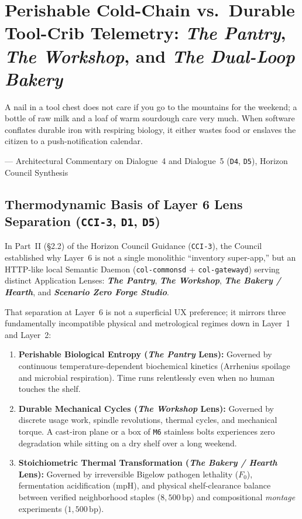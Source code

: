 \chapter{Perishable Cold-Chain vs.\ Durable Tool-Crib Telemetry: \textit{The Pantry}, \textit{The Workshop}, and \textit{The Dual-Loop Bakery}}
\label{ch:pantry-vs-workshop-telemetry}

\epigraph{A nail in a tool chest does not care if you go to the mountains for the weekend; a bottle of raw milk and a loaf of warm sourdough care very much. When software conflates durable iron with respiring biology, it either wastes food or enslaves the citizen to a push-notification calendar.}{--- Architectural Commentary on Dialogue~4 and Dialogue~5 (\texttt{D4}, \texttt{D5}), Horizon Council Synthesis}

\section{Thermodynamic Basis of Layer 6 Lens Separation (\texttt{CCI-3}, \texttt{D1}, \texttt{D5})}
\label{sec:l2-thermodynamic-lens-separation}

In Part~II (\S2.2) of the Horizon Council Guidance (\texttt{CCI-3}), the Council established why Layer~6 is not a single monolithic ``inventory super-app,'' but an HTTP-like local Semantic Daemon (\texttt{col-commonsd} + \texttt{col-gatewayd}) serving distinct Application Lenses: \textbf{\textit{The Pantry}}, \textbf{\textit{The Workshop}}, \textbf{\textit{The Bakery / Hearth}}, and \textbf{\textit{Scenario Zero Forge Studio}}.

That separation at Layer~6 is not a superficial UX preference; it mirrors three fundamentally incompatible physical and metrological regimes down in Layer~1 and Layer~2:
\begin{enumerate}
    \item \textbf{Perishable Biological Entropy (\textit{The Pantry} Lens):} Governed by continuous temperature-dependent biochemical kinetics (Arrhenius spoilage and microbial respiration). Time runs relentlessly even when no human touches the shelf.
    \item \textbf{Durable Mechanical Cycles (\textit{The Workshop} Lens):} Governed by discrete usage work, spindle revolutions, thermal cycles, and mechanical torque. A cast-iron plane or a box of \texttt{M6} stainless bolts experiences zero degradation while sitting on a dry shelf over a long weekend.
    \item \textbf{Stoichiometric Thermal Transformation (\textit{The Bakery / Hearth} Lens):} Governed by irreversible Bigelow pathogen lethality ($F_0$), fermentation acidification ($\mathrm{mpH}$), and physical shelf-clearance balance between verified neighborhood staples ($8{,}500\,\mathrm{bp}$) and compositional \textit{montage} experiments ($1{,}500\,\mathrm{bp}$).
\end{enumerate}

